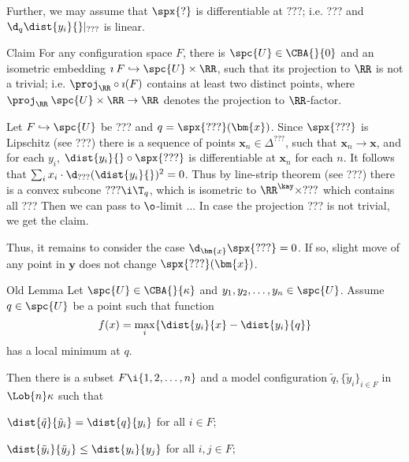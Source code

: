 {Further, we may assume that $\spx{?}$ is differentiable at $???$;
i.e. ??? and $\d_q\dist{y_i}{}|_{???}$ is linear.

\begin{clm}{Claim}
For any configuration space $F$,
there is $\spc{U}\in\CBA{}{0}$ and an isometric embedding $\imath\:F\hookrightarrow\spc{U}\times\RR$,
such that its projection to $\RR$ is not a trivial; 
i.e. $\proj_\RR\circ\imath(F)$ contains at least two distinct points, where $\proj_\RR\:\spc{U}\times\RR\to\RR$ denotes the projection to $\RR$-factor.
\end{clm}

Let $F\hookrightarrow\spc{U}$ be ???
and $q=\spx{???}(\bm{x})$.
Since $\spx{???}$ is Lipschitz (see ???)
there is a sequence of points $\bm{x}_n\in\Delta^{???}$, such that 
$\bm{x}_n\to\bm{x}$,
and for each $y_i$, $\dist{y_i}{}\circ\spx{???}$ is differentiable at $\bm{x}_n$ for each $n$.
It follows that $\sum_i x_i\cdot\d_{???}(\dist{y_i}{})^2=0$.
Thus by line-strip theorem (see ???) there is a convex subcone $???\i\T_q$,
which is  isometric to $\RR^\kay\times ???$ which contains all ???
Then we can pass to $\o$-limit ...
In case the projection ??? is not trivial, we get the claim.

Thus, it remains to consider the case $\d_{\bm{x}}\spx{???}=0$.
If so, slight move of any point in $\bm{y}$ does not change $\spx{???}(\bm{x})$. 


 
\qeds


















\begin{thm}{Old Lemma}\label{lem:neg-config:old}
Let $\spc{U}\in \CBA{}{\kappa}$ 
and $y_1,y_2,\dots, y_n\in \spc{U}$.
Assume $q\in \spc{U}$ be a point such that function
$$f(x)=\max_{i}\{\dist{y_i}{x}-\dist{y_i}{q}\}$$
has a local minimum at $q$.

Then there is a subset $F\i\{1,2,\dots,n\}$ and a model configuration
$\tilde q,\{\tilde y_i\}_{i\in F}$ in $\Lob{n}\kappa$ such that 
\begin{subthm}{}
$\dist{\tilde q}{\tilde y_i}= \dist{q}{y_i}$ for all $i\in F$; 
\end{subthm}


\begin{subthm}{}$\dist{\tilde y_i}{\tilde y_j}\le\dist{y_i}{y_j}$ for all $i,j\in F$;
\end{subthm}


\end{thm}}
